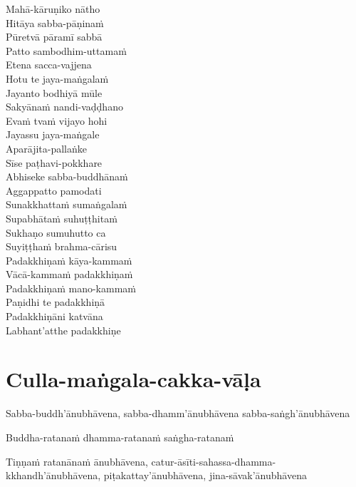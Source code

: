 \begin{paritta}

Mahā-kāruṇiko nātho\\
Hitāya sabba-pāṇinaṁ\\
Pūretvā pāramī sabbā\\
Patto sambodhim-uttamaṁ\\
Etena sacca-vajjena\\
Hotu te jaya-maṅgalaṁ\\
Jayanto bodhiyā mūle\\
Sakyānaṁ nandi-vaḍḍhano\\
Evaṁ tvaṁ vijayo hohi\\
Jayassu jaya-maṅgale\\
Aparājita-pallaṅke\\
Sīse paṭhavi-pokkhare\\
Abhiseke sabba-buddhānaṁ\\
Aggappatto pamodati\\
Sunakkhattaṁ sumaṅgalaṁ\\
Supabhātaṁ suhuṭṭhitaṁ\\
Sukhaṇo sumuhutto ca\\
Suyiṭṭhaṁ brahma-cārisu\\
Padakkhiṇaṁ kāya-kammaṁ\\
Vācā-kammaṁ padakkhiṇaṁ\\
Padakkhiṇaṁ mano-kammaṁ\\
Paṇidhi te padakkhiṇā\\
Padakkhiṇāni katvāna\\
Labhant'atthe padakkhiṇe


\end{paritta}

\clearpage

\chapter{Culla-maṅgala-cakka-vāḷa}


Sabba-buddh'ānubhāvena, sabba-dhamm'ānubhāvena sabba-saṅgh'ānubhāvena

Buddha-ratanaṁ dhamma-ratanaṁ saṅgha-ratanaṁ

Tiṇṇaṁ ratanānaṁ ānubhāvena,
catur-āsīti-sahassa-dhamma-\\ kkhandh'ānubhāvena,
piṭakattay'ānubhāvena,
jina-sāvak'ānubhāvena

